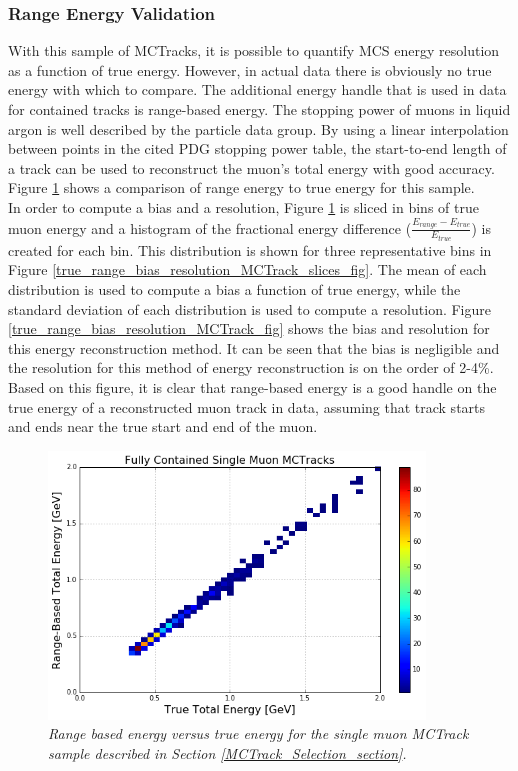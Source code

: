 \subsubsection{Range Energy Validation}\label{Range_Energy_Validation_section}
With this sample of {\sc MCTracks}, it is possible to quantify MCS energy resolution as a function of true energy. However, in actual {\ub} data there is obviously no true energy with which to compare. The additional energy handle that is used in data for contained tracks is range-based energy. The stopping power of muons in liquid argon is well described by the particle data group\cite{PDG_spline_table}. By using a linear interpolation between points in the cited PDG stopping power table, the start-to-end length of a track can be used to reconstruct the muon's total energy with good accuracy. Figure \ref{true_range_energy_MCTrack_fig} shows a comparison of range energy to true energy for this sample. \\

In order to compute a bias and a resolution, Figure \ref{true_range_energy_MCTrack_fig} is sliced in bins of true muon energy and a histogram of the fractional energy difference ($\frac{E_{range} - E_{true}}{E_{true}}$) is created for each bin. This distribution is shown for three representative bins in Figure \ref{true_range_bias_resolution_MCTrack_slices_fig}. The mean of each distribution is used to compute a bias a function of true energy, while the standard deviation of each distribution is used to compute a resolution. Figure \ref{true_range_bias_resolution_MCTrack_fig} shows the bias and resolution for this energy reconstruction method. It can be seen that the bias is negligible and the resolution for this method of energy reconstruction is on the order of 2-4\%. Based on this figure, it is clear that range-based energy is a good handle on the true energy of a reconstructed muon track in {\ub} data, assuming that track starts and ends near the true start and end of the muon.

\begin{figure}[h!]
\begin{center}
\includegraphics[width=100mm]{Figures/true_range_comparison_MCTracks.png}
\end{center}
\caption{\textit{Range based energy versus true energy for the single muon {\sc MCTrack} sample described in Section \ref{MCTrack_Selection_section}.}}
\label{true_range_energy_MCTrack_fig}
\end{figure}

